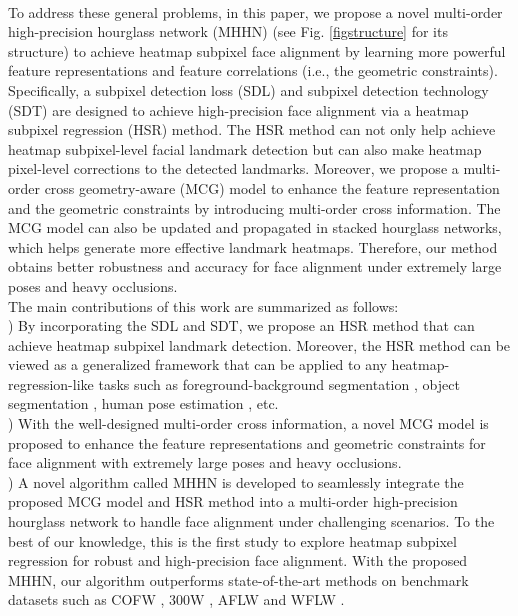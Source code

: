 \documentclass[journal]{IEEEtran}
\begin{document}
\\\indent To address these general problems, in this paper, we propose a novel multi-order high-precision hourglass network (MHHN) (see Fig. \ref{figstructure} for its structure) to achieve heatmap subpixel face alignment by learning more powerful feature representations and feature correlations (i.e., the geometric constraints). Specifically, a subpixel detection loss (SDL) and subpixel detection technology (SDT) are designed to achieve high-precision face alignment via a heatmap subpixel regression (HSR) method. The HSR method can not only help achieve heatmap subpixel-level facial landmark detection but can also make heatmap pixel-level corrections to the detected landmarks. Moreover, we propose a multi-order cross geometry-aware (MCG) model to enhance the feature representation and the geometric constraints by introducing multi-order cross information. The MCG model can also be updated and propagated in stacked hourglass networks, which helps generate more effective landmark heatmaps. Therefore, our method obtains better robustness and accuracy for face alignment under extremely large poses and heavy occlusions.
\\\indent The main contributions of this work are summarized as follows:
\\) By incorporating the SDL and SDT, we propose an HSR method that can achieve heatmap subpixel landmark detection. Moreover, the HSR method can be viewed as a generalized framework that can be applied to any heatmap-regression-like tasks such as foreground-background segmentation \cite{Babaee2017ADC}, object segmentation \cite{Yu2015MultiScaleCA}, human pose estimation \cite{Bulat2016HumanPE}, etc.
\\) With the well-designed multi-order cross information, a novel MCG model is proposed to enhance the feature representations and geometric constraints for face alignment with extremely large poses and heavy occlusions. 
\\) A novel algorithm called MHHN is developed to seamlessly integrate the proposed MCG model and HSR method into a multi-order high-precision hourglass network to handle face alignment under challenging scenarios. To the best of our knowledge, this is the first study to explore heatmap subpixel regression for robust and high-precision face alignment. With the proposed MHHN, our algorithm outperforms state-of-the-art methods on benchmark datasets such as COFW \cite{Burgosartizzu2013Robust}, 300W \cite{Sagonas2016300FI}, AFLW \cite{Zhu2016UnconstrainedFA} and WFLW \cite{Wu2018LookAB}.
\end{document}
